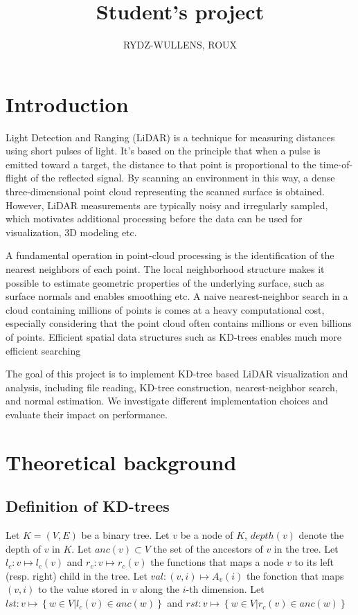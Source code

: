 \documentclass[10pt,a4paper,final]{article}
\author{RYDZ-WULLENS, ROUX}
\title{Student's project}
\begin{document}
\begin{titlepage}
\maketitle

\end{titlepage}


\section{Introduction}

Light Detection and Ranging (LiDAR) is a technique for measuring distances using short pulses of light. It's based on the principle that when a pulse is emitted toward a target, the distance to that point is proportional to the time-of-flight of the reflected signal. By scanning an environment in this way, a dense three-dimensional point cloud representing the scanned surface is obtained.
However, LiDAR measurements are typically noisy and irregularly sampled, which motivates additional processing before the data can be used for visualization, 3D modeling etc.

A fundamental operation in point-cloud processing is the identification of the nearest neighbors of each point. The local neighborhood structure makes it possible to estimate geometric properties of the underlying surface, such as surface normals and enables smoothing etc.
A naive nearest-neighbor search in a cloud containing millions of points is comes at a heavy computational cost, especially considering that the point cloud often contains millions or even billions of points. Efficient spatial data structures such as KD-trees enables much more efficient searching

The goal of this project is to implement KD-tree based LiDAR visualization and analysis, including file reading, KD-tree construction, nearest-neighbor search, and normal estimation. We investigate different implementation choices and evaluate their impact on performance.

\section{Theoretical background}


\subsection{Definition of KD-trees}

Let $K = (V,E)$ be a binary tree. Let $v$ be a node of $K$, $depth(v)$ denote the depth of $v$ in $K$. Let $anc(v) \subset V $ the set of the ancestors of $v$ in the tree. Let $l_c : v \mapsto l_c(v)$ and $r_c : v \mapsto r_c(v)$ the functions that maps a node $v$ to its left (resp. right) child in the tree. Let $val : (v,i) \mapsto A_v(i)$ the fonction that maps $(v,i)$ to the value stored in $v$ along the $i$-th dimension. Let $lst : v \mapsto \left\{w\in V | l_c(v) \in anc(w) \right\}$ and  $rst : v \mapsto  \left\{w\in V | r_c(v) \in anc(w) \right\}$
\end{document}
